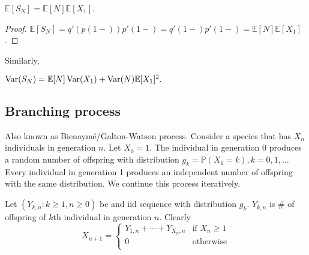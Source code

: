 \begin{corollary}
    $ \mathbb{E}[S_N] =\mathbb{E}[N]\mathbb{E}[X_1] $.
\end{corollary}
\begin{proof}
    $ \mathbb{E}[S_N]= q'(p(1-)) p'(1-)=q'(1-)p'(1-)=\mathbb{E}[N]\mathbb{E}[X_1]$.
\end{proof}
Similarly,
\begin{corollary}
    $ \operatorname{Var}(S_N)=\mathbb{E}[N]\operatorname{Var}(X_1)+\operatorname{Var}(N)\mathbb{E}[X_1]^2 . $
\end{corollary}

\subsection{Branching process}
Also known as Bienaym\'{e}/Galton-Watson process. Consider a species that has $X_n$ individuals in generation $n$. Let $ X_0=1 $. The individual in generation 0 produces a random number of offspring with distribution $ g_k = \mathbb{P}(X_1=k),k=0,1,\dots $ Every individual in generation 1 produces an independent number of offspring with the same distribution. We continue this process iteratively.

Let $ (Y_{k,n}: k\ge 1,n\ge 0) $ be and iid sequence with distribution $ g_k $. $Y_{k,n}$ is \# of offspring of $k$th individual in generation $n$. Clearly 
\[
    X_{n+1} = \begin{cases}
    Y_{1,n}+\cdots+Y_{X_n,n} &\text{if } X_n\ge 1\\
    0 &\text{otherwise}\\
    \end{cases} 
\]

